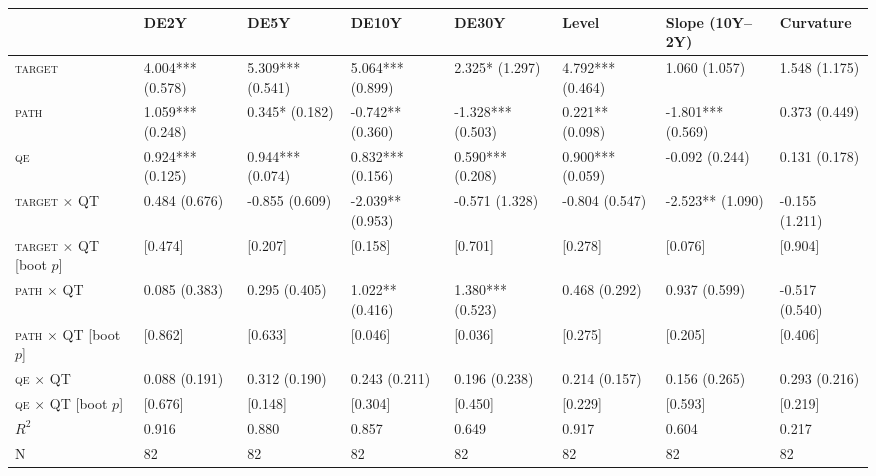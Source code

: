 \begin{tabular}{llllllll}
\toprule
 & DE2Y & DE5Y & DE10Y & DE30Y & Level & Slope (10Y--2Y) & Curvature \\
\midrule
\textsc{target} & 4.004*** (0.578) & 5.309*** (0.541) & 5.064*** (0.899) & 2.325* (1.297) & 4.792*** (0.464) & 1.060 (1.057) & 1.548 (1.175) \\
\textsc{path} & 1.059*** (0.248) & 0.345* (0.182) & -0.742** (0.360) & -1.328*** (0.503) & 0.221** (0.098) & -1.801*** (0.569) & 0.373 (0.449) \\
\textsc{qe} & 0.924*** (0.125) & 0.944*** (0.074) & 0.832*** (0.156) & 0.590*** (0.208) & 0.900*** (0.059) & -0.092 (0.244) & 0.131 (0.178) \\
\textsc{target} $\times$ QT & 0.484 (0.676) & -0.855 (0.609) & -2.039** (0.953) & -0.571 (1.328) & -0.804 (0.547) & -2.523** (1.090) & -0.155 (1.211) \\
\textsc{target} $\times$ QT [boot $p$] & [0.474] & [0.207] & [0.158] & [0.701] & [0.278] & [0.076] & [0.904] \\
\textsc{path} $\times$ QT & 0.085 (0.383) & 0.295 (0.405) & 1.022** (0.416) & 1.380*** (0.523) & 0.468 (0.292) & 0.937 (0.599) & -0.517 (0.540) \\
\textsc{path} $\times$ QT [boot $p$] & [0.862] & [0.633] & [0.046] & [0.036] & [0.275] & [0.205] & [0.406] \\
\textsc{qe} $\times$ QT & 0.088 (0.191) & 0.312 (0.190) & 0.243 (0.211) & 0.196 (0.238) & 0.214 (0.157) & 0.156 (0.265) & 0.293 (0.216) \\
\textsc{qe} $\times$ QT [boot $p$] & [0.676] & [0.148] & [0.304] & [0.450] & [0.229] & [0.593] & [0.219] \\
$R^2$ & 0.916 & 0.880 & 0.857 & 0.649 & 0.917 & 0.604 & 0.217 \\
N & 82 & 82 & 82 & 82 & 82 & 82 & 82 \\
\bottomrule
\end{tabular}
